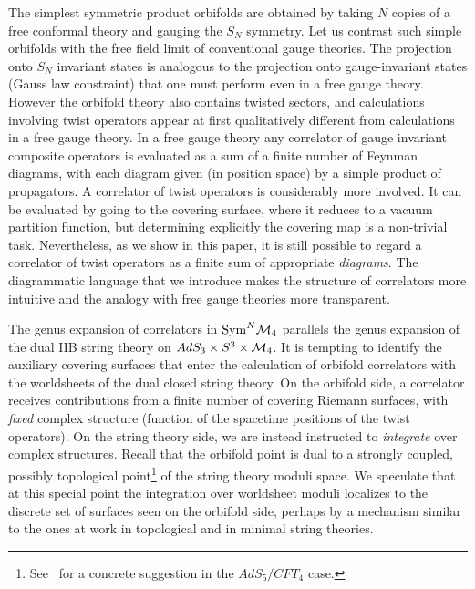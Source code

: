 \documentclass[letterpaper]{JHEP3}
\begin{document}
The simplest symmetric product orbifolds  are obtained by taking $N$ copies of a free conformal theory and gauging the $S_N$ symmetry.
Let us contrast such simple orbifolds with the free field limit of conventional gauge theories.
The projection onto $S_N$ invariant states is analogous
to the projection onto gauge-invariant states (Gauss law constraint) that one must perform
even in  a free gauge theory. However the orbifold theory also contains
twisted sectors, and calculations involving   twist operators appear
at first qualitatively different from calculations in a free gauge theory.
In a free gauge theory any correlator of gauge invariant composite operators is evaluated as a sum of a finite number of Feynman diagrams, with
each diagram given (in position space) by  a simple product of propagators.  
A correlator of twist operators is considerably more involved.
It  can be evaluated by going to the covering surface, where it reduces to a vacuum partition function, but
determining explicitly the covering map is  a non-trivial task.
Nevertheless, as we show in this paper, it is still possible
to regard a correlator of twist operators as a finite sum of appropriate {\it diagrams}.
The diagrammatic language that we introduce  makes the structure of correlators
more intuitive and  the analogy with free gauge theories more transparent.


The genus expansion of correlators in ${\rm Sym}^N {\cal M}_4$ parallels the genus expansion
of the dual IIB string theory on $AdS_3 \times S^3 \times {\cal M}_4$. It is tempting to identify
the auxiliary covering surfaces that enter the calculation of orbifold correlators with the worldsheets
of the dual closed string theory.  On the orbifold side, a correlator receives contributions
from a finite number of covering Riemann surfaces, with {\it fixed} complex structure (function of the spacetime positions
of the twist operators).
On the string theory side, we are instead instructed to {\it integrate} over complex structures.
Recall that the orbifold point  is dual to a strongly coupled, possibly topological point\footnote{
See~\cite{Berkovits:2008ga} for a concrete suggestion in the $AdS_5/CFT_4$ case.}  of the string theory moduli space.
 We speculate that at this special point
  the integration over worldsheet moduli localizes to the discrete set of surfaces seen on the orbifold side, perhaps by a mechanism similar
 to the ones at work in topological \cite{Distler:1989ax, Verlinde:1990ku} and in minimal \cite{Belavin:2006ex} string theories. 
\end{document}
